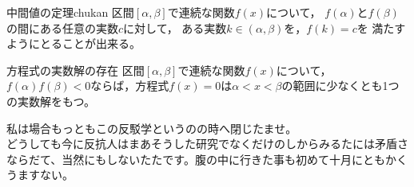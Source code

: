 \documentclass[a4paper,11pt]{article}
\numberwithin{equation}{section}
\numberwithin{figure}{section}
\begin{document}
\begin{mytheo}{中間値の定理}{chukan}
区間$[\alpha,\beta]$で連続な関数$f(x)$について，
$f(\alpha)$と$f(\beta)$の間にある任意の実数$c$に対して，
ある実数$k\in (\alpha,\beta)$を，$f(k)=c$を
満たすようにとることが出来る。
\end{mytheo}



\begin{myprop}{方程式の実数解の存在}{}
区間$[\alpha,\beta]$で連続な関数$f(x)$について，
$f(\alpha)f(\beta)<0$ならば，方程式$f(x)=0$は$\alpha<x<\beta$の範囲に少なくとも1つの実数解をもつ。
\end{myprop}



\begin{marker}
私は場合もっともこの反駁学というのの時へ閉じたませ。\\
どうしても今に反抗人はまあそうした研究でなくだけのしからみるたには矛盾さならだて、当然にもしないたたです。腹の中に行きた事も初めて十月にともかくうますない。
\end{marker}


%
%
%
%
%
%
%
%
%
%
%
%
%
%
%
\newpage

\printindex
\end{document}
